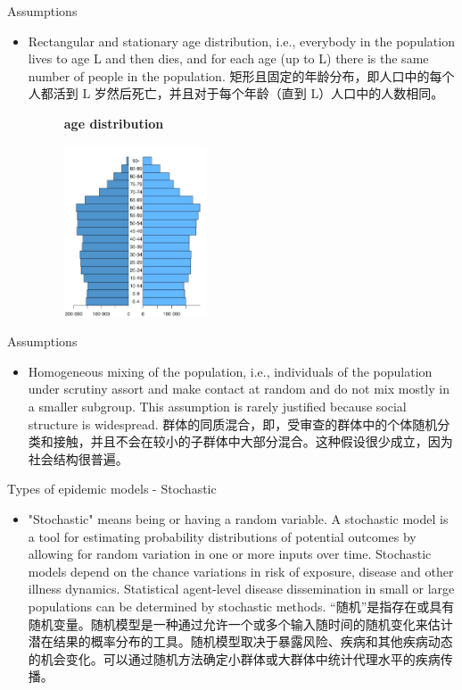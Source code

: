 \documentclass[
  notheorems,
  aspectratio=54,
]{beamer}
\begin{document}
\begin{frame}{Assumptions}
  \begin{itemize}
    \item Rectangular and stationary age distribution, i.e., everybody in the population lives to age L and then dies, and for each age (up to L) there is the same number of people in the population. 矩形且固定的年龄分布，即人口中的每个人都活到 L 岁然后死亡，并且对于每个年龄（直到 L）人口中的人数相同。
  \begin{figure}
    \centering
    \textbf{age distribution}\par\medskip
    \includegraphics[width=0.4\textwidth]{age_distribution.png}
  \end{figure}
  \end{itemize}
\end{frame}

\begin{frame}{Assumptions}
  \begin{itemize}
    \item Homogeneous mixing of the population, i.e., individuals of the population under scrutiny assort and make contact at random and do not mix mostly in a smaller subgroup. This assumption is rarely justified because social structure is widespread. 群体的同质混合，即，受审查的群体中的个体随机分类和接触，并且不会在较小的子群体中大部分混合。这种假设很少成立，因为社会结构很普遍。
  \end{itemize}
\end{frame}

\begin{frame}{Types of epidemic models - Stochastic}
  \begin{itemize}
    \item "Stochastic" means being or having a random variable. A stochastic model is a tool for estimating probability distributions of potential outcomes by allowing for random variation in one or more inputs over time. Stochastic models depend on the chance variations in risk of exposure, disease and other illness dynamics. Statistical agent-level disease dissemination in small or large populations can be determined by stochastic methods. “随机”是指存在或具有随机变量。随机模型是一种通过允许一个或多个输入随时间的随机变化来估计潜在结果的概率分布的工具。随机模型取决于暴露风险、疾病和其他疾病动态的机会变化。可以通过随机方法确定小群体或大群体中统计代理水平的疾病传播。
  \end{itemize}
\end{frame}
\end{document}
